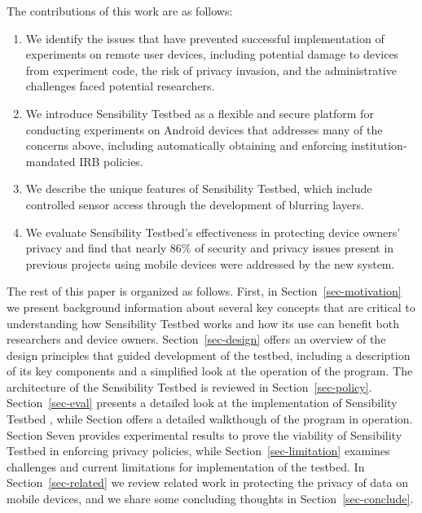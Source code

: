 The contributions of this work are as follows:

\begin{enumerate}
\item We identify the issues that have prevented successful implementation
of experiments on remote user devices, including potential damage to
devices from experiment code, the risk of privacy invasion, and the
administrative challenges faced potential researchers. 

\item We introduce Sensibility Testbed as a flexible and secure platform for
conducting experiments on Android devices that addresses many of the
concerns above, including automatically obtaining and enforcing 
institution-mandated IRB policies.

\item We describe the unique features of Sensibility Testbed, which include 
controlled sensor access through the development of blurring layers.

\item We evaluate Sensibility Testbed's effectiveness in
protecting device owners' privacy and find that nearly 86\% of
security and privacy issues present in previous projects using 
mobile devices were addressed by the new system.
\end{enumerate}

The rest of this paper is organized as follows. First, in Section~\ref{sec-motivation} we
present background information about several key concepts that are
critical to understanding how Sensibility Testbed works and how its use can benefit both researchers and device owners. Section~\ref{sec-design} offers an overview of the design principles that guided  development of the testbed, including a description of its key components and a simplified look at the operation of the program. The architecture of the Sensibility Testbed is reviewed in Section~\ref{sec-policy}. Section~\ref{sec-eval} presents a detailed look at the implementation of Sensibility Testbed , while Section offers a detailed walkthough of the program in operation. Section Seven provides experimental results to prove the
viability of Sensibility Testbed in enforcing privacy policies, while
Section~\ref{sec-limitation} examines challenges and current limitations for
implementation of the testbed. In Section~\ref{sec-related} we review related work
in protecting the privacy of data on mobile devices, and we share some
concluding thoughts in Section~\ref{sec-conclude}.

